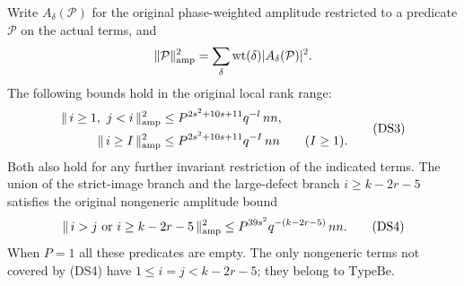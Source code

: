 \begin{theorem}
\label{thm:flag-defect-stratification}
Write \(A_\delta(\mathcal P)\) for the original phase-weighted
amplitude restricted to a predicate \(\mathcal P\) on the
actual terms, and
\[
 \|\mathcal P\|_{\rm amp}^2
       =\sum_\delta \mathrm{wt}(\delta)|A_\delta(\mathcal P)|^2 .
\]
The following bounds hold in the original local rank range:
\[
 \begin{split}
 \|\,i\ge1,\ j<i\,\|_{\rm amp}^2
    &\le P^{2s^2+10s+11}q^{-l}\,nn,\\
 \|\,i\ge I\,\|_{\rm amp}^2
    &\le P^{2s^2+10s+11}q^{-I}\,nn
                      \qquad(I\ge1).
 \end{split}                                                   \tag{DS3}
\]
Both also hold for any further invariant restriction of the
indicated terms. The union of the strict-image branch and
the large-defect branch \(i\ge k-2r-5\) satisfies the original
nongeneric amplitude bound
\[
 \|\,i>j\ \text{or}\ i\ge k-2r-5\,\|_{\rm amp}^2
        \le P^{39s^2}q^{-(k-2r-5)}\,nn.                    \tag{DS4}
\]
When \(P=1\) all these predicates are empty. The only
nongeneric terms not covered by (DS4) have
\(1\le i=j<k-2r-5\); they belong to \(\mathrm{TypeBe}\).
\end{theorem}
